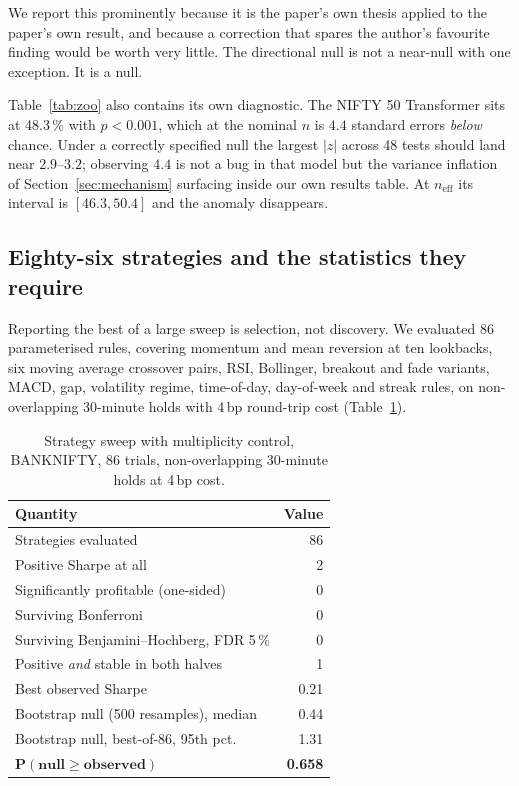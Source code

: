 \documentclass[conference]{IEEEtran}
\begin{document}
We report this prominently because it is the paper's own thesis applied to the
paper's own result, and because a correction that spares the author's favourite
finding would be worth very little. The directional null is not a near-null with
one exception. It is a null.

Table~\ref{tab:zoo} also contains its own diagnostic. The NIFTY 50 Transformer
sits at 48.3\,\% with $p<0.001$, which at the nominal $n$ is $4.4$ standard
errors \emph{below} chance. Under a correctly specified null the largest $|z|$
across 48 tests should land near $2.9$--$3.2$; observing $4.4$ is
not a bug in that model but the variance inflation of
Section~\ref{sec:mechanism} surfacing inside our own results table. At
$n_{\text{eff}}$ its interval is $[46.3, 50.4]$ and the anomaly disappears.

\subsection{Eighty-six strategies and the statistics they require}

Reporting the best of a large sweep is selection, not discovery. We evaluated 86
parameterised rules, covering momentum and mean reversion at ten lookbacks, six
moving average crossover pairs, RSI, Bollinger, breakout and fade variants,
MACD, gap, volatility regime, time-of-day, day-of-week and streak rules, on
non-overlapping 30-minute holds with 4\,bp round-trip cost
(Table~\ref{tab:sweep}).

\begin{table}[!tb]
\caption{Strategy sweep with multiplicity control, BANKNIFTY, 86 trials,
non-overlapping 30-minute holds at 4\,bp cost.}
\label{tab:sweep}
\centering
\footnotesize
\setlength{\tabcolsep}{4pt}
\begin{tabular}{@{}lr@{}}
\toprule
\textbf{Quantity} & \textbf{Value} \\
\midrule
Strategies evaluated & 86 \\
Positive Sharpe at all & 2 \\
Significantly profitable (one-sided) & 0 \\
Surviving Bonferroni & 0 \\
Surviving Benjamini--Hochberg, FDR 5\,\% & 0 \\
Positive \emph{and} stable in both halves & 1 \\
\midrule
Best observed Sharpe & 0.21 \\
Bootstrap null (500 resamples), median & 0.44 \\
Bootstrap null, best-of-86, 95th pct. & 1.31 \\
$\boldsymbol{P(\text{null} \geq \text{observed})}$ & \textbf{0.658} \\
\bottomrule
\end{tabular}
\end{table}
\end{document}
